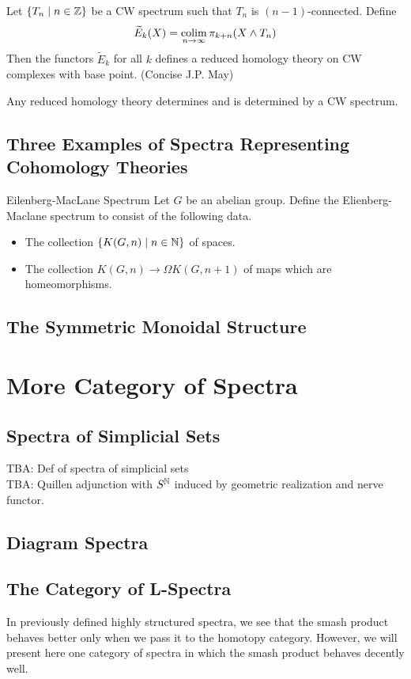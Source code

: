 \documentclass[a4paper]{article}
\begin{document}
\begin{thm}{}{} Let $\{T_n\;|\;n\in\mathbb{Z}\}$ be a CW spectrum such that $T_n$ is $(n-1)$-connected. Define $$\widetilde{E}_k(X)=\operatorname*{colim}_{n\to\infty}\pi_{k+n}(X\wedge T_n)$$ Then the functors $\widetilde{E}_k$ for all $k$ defines a reduced homology theory on CW complexes with base point. (Concise J.P. May)
\end{thm}

\begin{thm}{}{} Any reduced homology theory determines and is determined by a CW spectrum. 
\end{thm}

\subsection{Three Examples of Spectra Representing Cohomology Theories}
\begin{defn}{Eilenberg-MacLane Spectrum}{} Let $G$ be an abelian group. Define the Elienberg-Maclane spectrum to consist of the following data. 
\begin{itemize}
\item The collection $\{K(G,n)\;|\;n\in\mathbb{N}\}$ of spaces. 
\item The collection $K(G,n)\to\Omega K(G,n+1)$ of maps which are homeomorphisms. 
\end{itemize}
\end{defn}

\subsection{The Symmetric Monoidal Structure}

\pagebreak
\section{More Category of Spectra}
\subsection{Spectra of Simplicial Sets}
TBA: Def of spectra of simplicial sets\\
TBA: Quillen adjunction with $S^{\mathbb{N}}$ induced by geometric realization and nerve functor. 

\subsection{Diagram Spectra}

\subsection{The Category of L-Spectra}
In previously defined highly structured spectra, we see that the smash product behaves better only when we pass it to the homotopy category. However, we will present here one category of spectra in which the smash product behaves decently well. 
\end{document}
